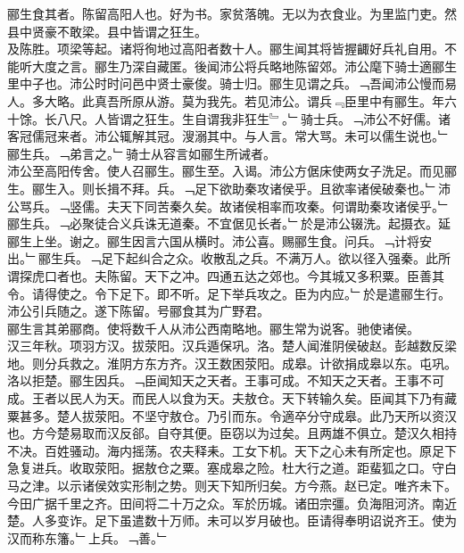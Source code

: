 \documentclass{zhvt-classic}
\begin{document}

\hspace*{2em}郦生食其者。陈留高阳人也。好为书。家贫落魄。无以为衣食业。为里监门吏。然县中贤豪不敢梁。县中皆谓之狂生。\\
\hspace*{2em}及陈胜。项梁等起。诸将徇地过高阳者数十人。郦生闻其将皆握齱好兵礼自用。不能听大度之言。郦生乃深自藏匿。後闻沛公将兵略地陈留郊。沛公麾下骑士適郦生里中子也。沛公时时问邑中贤士豪俊。骑士归。郦生见谓之兵。﹁吾闻沛公慢而易人。多大略。此真吾所原从游。莫为我先。若见沛公。谓兵﹃臣里中有郦生。年六十馀。长八尺。人皆谓之狂生。生自谓我非狂生﹄。﹂骑士兵。﹁沛公不好儒。诸客冠儒冠来者。沛公辄解其冠。溲溺其中。与人言。常大骂。未可以儒生说也。﹂郦生兵。﹁弟言之。﹂骑士从容言如郦生所诫者。\\
\hspace*{2em}沛公至高阳传舍。使人召郦生。郦生至。入谒。沛公方倨床使两女子洗足。而见郦生。郦生入。则长揖不拜。兵。﹁足下欲助秦攻诸侯乎。且欲率诸侯破秦也。﹂沛公骂兵。﹁竖儒。夫天下同苦秦久矣。故诸侯相率而攻秦。何谓助秦攻诸侯乎。﹂郦生兵。﹁必聚徒合义兵诛无道秦。不宜倨见长者。﹂於是沛公辍洗。起摄衣。延郦生上坐。谢之。郦生因言六国从横时。沛公喜。赐郦生食。问兵。﹁计将安出。﹂郦生兵。﹁足下起纠合之众。收散乱之兵。不满万人。欲以径入强秦。此所谓探虎口者也。夫陈留。天下之冲。四通五达之郊也。今其城又多积粟。臣善其令。请得使之。令下足下。即不听。足下举兵攻之。臣为内应。﹂於是遣郦生行。沛公引兵随之。遂下陈留。号郦食其为广野君。\\
\hspace*{2em}郦生言其弟郦商。使将数千人从沛公西南略地。郦生常为说客。驰使诸侯。\\
\hspace*{2em}汉三年秋。项羽方汉。拔荥阳。汉兵遁保巩。洛。楚人闻淮阴侯破赵。彭越数反梁地。则分兵救之。淮阴方东方齐。汉王数困荥阳。成皋。计欲捐成皋以东。屯巩。洛以拒楚。郦生因兵。﹁臣闻知天之天者。王事可成。不知天之天者。王事不可成。王者以民人为天。而民人以食为天。夫敖仓。天下转输久矣。臣闻其下乃有藏粟甚多。楚人拔荥阳。不坚守敖仓。乃引而东。令適卒分守成皋。此乃天所以资汉也。方今楚易取而汉反郤。自夺其便。臣窃以为过矣。且两雄不俱立。楚汉久相持不决。百姓骚动。海内摇荡。农夫释耒。工女下机。天下之心未有所定也。原足下急复进兵。收取荥阳。据敖仓之粟。塞成皋之险。杜大行之道。距蜚狐之口。守白马之津。以示诸侯效实形制之势。则天下知所归矣。方今燕。赵已定。唯齐未下。今田广据千里之齐。田间将二十万之众。军於历城。诸田宗彊。负海阻河济。南近楚。人多变诈。足下虽遣数十万师。未可以岁月破也。臣请得奉明诏说齐王。使为汉而称东籓。﹂上兵。﹁善。﹂\\
\end{document}
